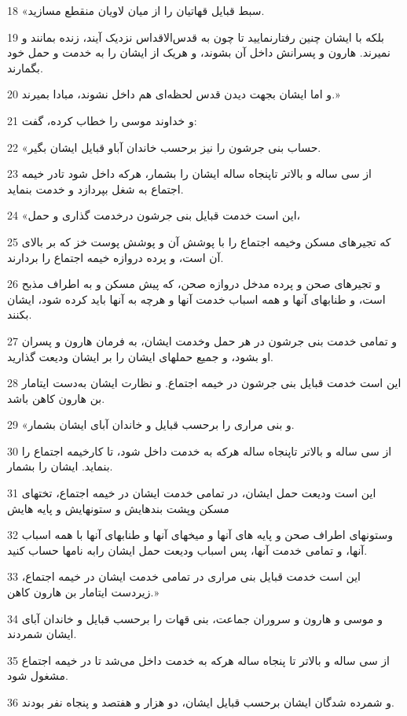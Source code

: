 \par 18 «سبط قبایل قهاتیان را از میان لاویان منقطع مسازید.
\par 19 بلکه با ایشان چنین رفتارنمایید تا چون به قدس‌الاقداس نزدیک آیند، زنده بمانند و نمیرند. هارون و پسرانش داخل آن بشوند، و هریک از ایشان را به خدمت و حمل خود بگمارند.
\par 20 و اما ایشان بجهت دیدن قدس لحظه‌ای هم داخل نشوند، مبادا بمیرند.»
\par 21 و خداوند موسی را خطاب کرده، گفت:
\par 22 «حساب بنی جرشون را نیز برحسب خاندان آباو قبایل ایشان بگیر.
\par 23 از سی ساله و بالاتر تاپنجاه ساله ایشان را بشمار، هر‌که داخل شود تادر خیمه اجتماع به شغل بپردازد و خدمت بنماید.
\par 24 «این است خدمت قبایل بنی جرشون درخدمت گذاری و حمل،
\par 25 که تجیرهای مسکن وخیمه اجتماع را با پوشش آن و پوشش پوست خز که بر بالای آن است، و پرده دروازه خیمه اجتماع را بردارند.
\par 26 و تجیرهای صحن و پرده مدخل دروازه صحن، که پیش مسکن و به اطراف مذبح است، و طنابهای آنها و همه اسباب خدمت آنها و هرچه به آنها باید کرده شود، ایشان بکنند.
\par 27 و تمامی خدمت بنی جرشون در هر حمل وخدمت ایشان، به فرمان هارون و پسران او بشود، و جمیع حملهای ایشان را بر ایشان ودیعت گذارید.
\par 28 این است خدمت قبایل بنی جرشون در خیمه اجتماع. و نظارت ایشان به‌دست ایتامار بن هارون کاهن باشد.
\par 29 «و بنی مراری را برحسب قبایل و خاندان آبای ایشان بشمار.
\par 30 از سی ساله و بالاتر تاپنجاه ساله هرکه به خدمت داخل شود، تا کارخیمه اجتماع را بنماید. ایشان را بشمار.
\par 31 این است ودیعت حمل ایشان، در تمامی خدمت ایشان در خیمه اجتماع، تختهای مسکن وپشت بندهایش و ستونهایش و پایه هایش
\par 32 وستونهای اطراف صحن و پایه های آنها و میخهای آنها و طنابهای آنها با همه اسباب آنها، و تمامی خدمت آنها، پس اسباب ودیعت حمل ایشان رابه نامها حساب کنید.
\par 33 این است خدمت قبایل بنی مراری در تمامی خدمت ایشان در خیمه اجتماع، زیردست ایتامار بن هارون کاهن.»
\par 34 و موسی و هارون و سروران جماعت، بنی قهات را برحسب قبایل و خاندان آبای ایشان شمردند.
\par 35 از سی ساله و بالاتر تا پنجاه ساله هرکه به خدمت داخل می‌شد تا در خیمه اجتماع مشغول شود.
\par 36 و شمرده شدگان ایشان برحسب قبایل ایشان، دو هزار و هفتصد و پنجاه نفر بودند.
